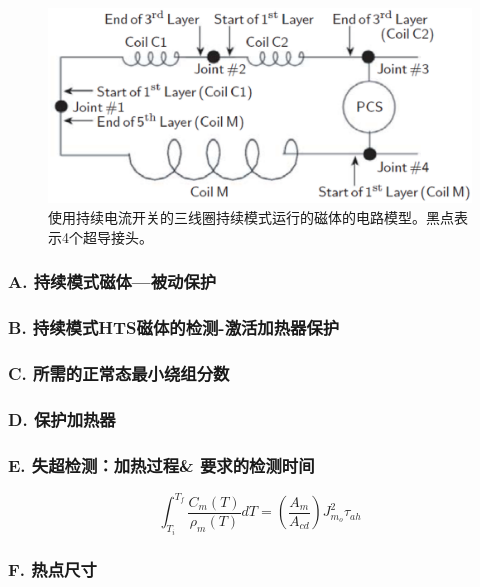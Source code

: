 {\begin{figure}
	\centering
	\includegraphics[scale=0.5]{chpt8/figs/fig8.25.eps}
	\caption{使用持续电流开关的三线圈持续模式运行的磁体的电路模型。黑点表示4个超导接头。}
\end{figure}

\subsubsection*{A. 持续模式磁体---被动保护}



\subsubsection*{B. 持续模式HTS磁体的检测-激活加热器保护}


\subsubsection*{C. 所需的正常态最小绕组分数}



\subsubsection*{D. 保护加热器}

\subsubsection*{E. 失超检测：加热过程\& 要求的检测时间}





\begin{equation}%
\int_{T_i}^{T_f}\frac{C_m(T)}{\rho_m(T)}dT=\left(\frac{A_m}{A_{cd}}\right)J_{m_o}^{2}\tau_{ah}
\end{equation}


\subsubsection*{F. 热点尺寸}

}
